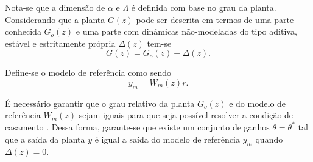     Nota-se que a dimensão de $\alpha$ e $\Lambda$ é definida com base no grau da planta.
    Considerando que a planta $G(z)$ pode ser descrita em termos de uma parte conhecida
    $G_o(z)$ e uma parte com dinâmicas não-modeladas do tipo aditiva, estável e estritamente
    própria $\Delta(z)$ tem-se
    \begin{equation}
        G(z) = G_o(z) + \Delta(z) \text{.}
        \label{eq:planta_go_delta}
    \end{equation}

    Define-se o modelo de referência como sendo
    \begin{equation*}
        y_m = W_m(z) r \text{.}
    \end{equation*}

    É necessário garantir que o grau relativo da planta $G_o(z)$ e do modelo de referência
    $W_m(z)$ sejam iguais para que seja possível resolver a condição de casamento
    \cite{ref:IOANNOU}. Dessa forma, garante-se que existe um conjunto de ganhos
    $\theta = \theta^*$ tal que a saída da planta $y$ é igual a saída do modelo de referência
    $y_m$ quando $\Delta(z) = 0$.

